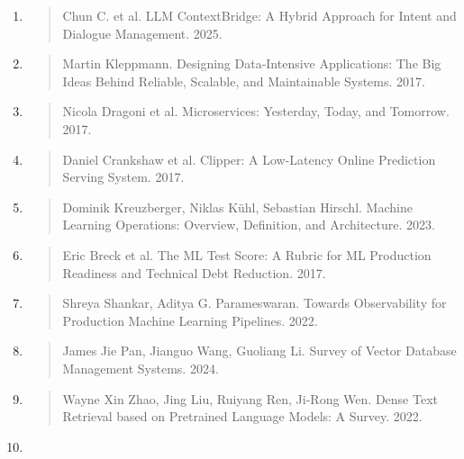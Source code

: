 \documentclass[
]{article}
\begin{document}
\begin{enumerate}
\begin{quote}
  Zangari A. et al. Ticket Automation: An Insight into Current Research
  with Applications to Multi-level Classification Scenarios. 2023.
  \end{quote}
\item
  \begin{quote}
  Chun C. et al. LLM ContextBridge: A Hybrid Approach for Intent and
  Dialogue Management. 2025.
  \end{quote}
\item
  \begin{quote}
  Martin Kleppmann. Designing Data-Intensive Applications: The Big Ideas
  Behind Reliable, Scalable, and Maintainable Systems. 2017.
  \end{quote}
\item
  \begin{quote}
  Nicola Dragoni et al. Microservices: Yesterday, Today, and Tomorrow.
  2017.
  \end{quote}
\item
  \begin{quote}
  Daniel Crankshaw et al. Clipper: A Low-Latency Online Prediction
  Serving System. 2017.
  \end{quote}
\item
  \begin{quote}
  Dominik Kreuzberger, Niklas Kühl, Sebastian Hirschl. Machine Learning
  Operations: Overview, Definition, and Architecture. 2023.
  \end{quote}
\item
  \begin{quote}
  Eric Breck et al. The ML Test Score: A Rubric for ML Production
  Readiness and Technical Debt Reduction. 2017.
  \end{quote}
\item
  \begin{quote}
  Shreya Shankar, Aditya G. Parameswaran. Towards Observability for
  Production Machine Learning Pipelines. 2022.
  \end{quote}
\item
  \begin{quote}
  James Jie Pan, Jianguo Wang, Guoliang Li. Survey of Vector Database
  Management Systems. 2024.
  \end{quote}
\item
  \begin{quote}
  Wayne Xin Zhao, Jing Liu, Ruiyang Ren, Ji-Rong Wen. Dense Text
  Retrieval based on Pretrained Language Models: A Survey. 2022.
  \end{quote}
\item

\end{enumerate}
\end{document}
